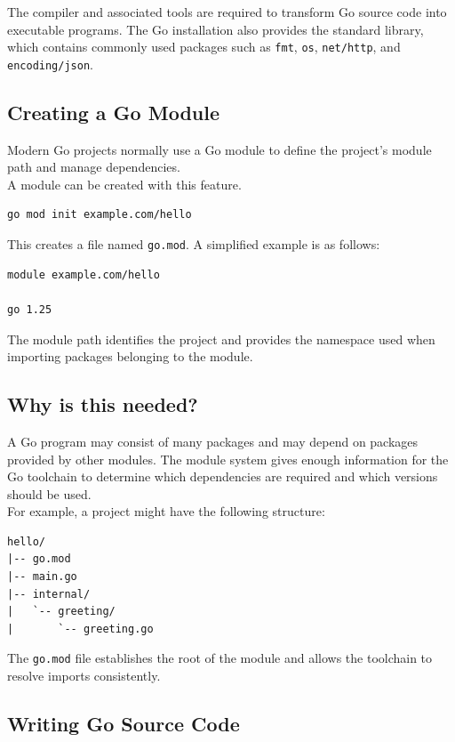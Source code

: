 The compiler and associated tools are required to transform Go source
code into executable programs.  The Go installation also provides the
standard library, which contains commonly used packages such as
\texttt{fmt}, \texttt{os}, \texttt{net/http}, and \texttt{encoding/json}.

\subsection{Creating a Go Module}

Modern Go projects normally use a Go module to define the project's
module path and manage dependencies.\\

A module can be created with this feature.

\begin{lstlisting}
go mod init example.com/hello
\end{lstlisting}

This creates a file named \texttt{go.mod}.  A simplified example is as follows:

\begin{lstlisting}
module example.com/hello

go 1.25
\end{lstlisting}

The module path identifies the project and provides the namespace used
when importing packages belonging to the module.

\subsection*{Why is this needed?}

A Go program may consist of many packages and may depend on packages
provided by other modules.  The module system gives enough information for the Go toolchain  to determine which dependencies are required and
which versions should be used.\\

For example, a project might have the following structure:

\begin{lstlisting}
hello/
|-- go.mod
|-- main.go
|-- internal/
|   `-- greeting/
|       `-- greeting.go
\end{lstlisting}

The \texttt{go.mod} file establishes the root of the module and allows
the toolchain to resolve imports consistently.

\subsection{Writing Go Source Code}

